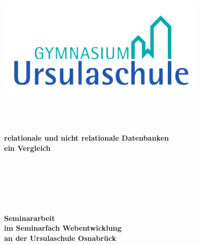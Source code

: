  \thispagestyle{empty}
\begin{titlepage}
	 \thispagestyle{empty}
\begin{center}
	 \thispagestyle{empty}

\begin{center}
	\includegraphics[width=10cm]{"Logo_Ursulaschule_2c"}
\end{center}

$~~$\\
\paragraph{}$~~$\\
\textbf{\huge relationale und nicht relationale Datenbanken}\\
\textbf{ ein Vergleich}\paragraph{}$~~$\\
\paragraph{}$~~$\\
\paragraph{}$~~$\\
\textbf{Seminararbeit}\\ \textbf{im Seminarfach Webentwicklung}\\ \textbf{an der Ursulaschule Osnabrück}
\paragraph{}$~~$\\

\end{center}
\end{titlepage}
